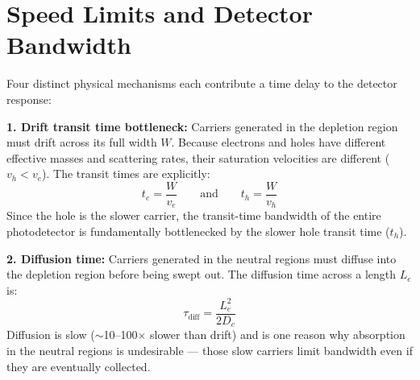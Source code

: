 \section{Speed Limits and Detector Bandwidth}

Four distinct physical mechanisms each contribute a time delay to the detector response:

\textbf{1. Drift transit time bottleneck:} Carriers generated in the depletion region must drift across its full width $W$. Because electrons and holes have different effective masses and scattering rates, their saturation velocities are different ($v_h < v_e$). The transit times are explicitly:
\begin{equation*}
    t_e = \frac{W}{v_e} \qquad \text{and} \qquad t_h = \frac{W}{v_h}
\end{equation*}
Since the hole is the slower carrier, the transit-time bandwidth of the entire photodetector is fundamentally bottlenecked by the slower hole transit time ($t_h$).

\textbf{2. Diffusion time:} Carriers generated in the neutral regions must diffuse into the depletion region before being swept out. The diffusion time across a length $L_e$ is:
\begin{equation*}
    \tau_\text{diff} = \frac{L_e^2}{2D_c}
\end{equation*}
Diffusion is slow ($\sim$10--100$\times$ slower than drift) and is one reason why absorption in the neutral regions is undesirable — those slow carriers limit bandwidth even if they are eventually collected.

